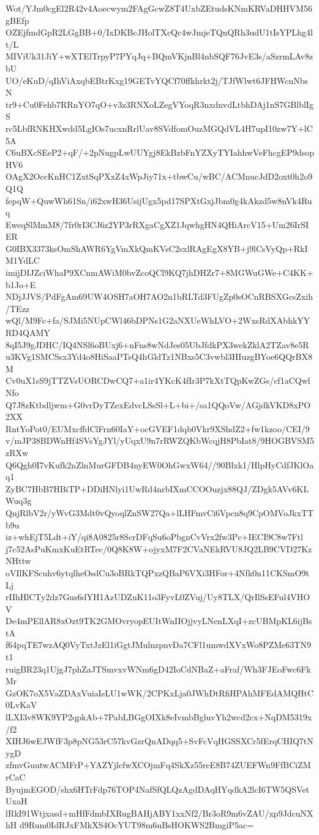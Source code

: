 Wot/YJm0cgEl2R42v4Aoecwym2FAgGcwZ8T4UxbZEtudsKNmKRVaDHHVM56gBEfp
OZEjfmdGpR2LGgBB+0/IxDKBcJHolTXcQc4wJmjeTQnQRh3udU1tIsYPLhg4lt/L
MIViUk31JiY+wXTElTrpyP7PYqJq+BQmVKjnBl4nbSQF76JvE3s/aSzrmLAv8zbU
UO/eKuD/qIhViAxqbEBtrKxg19GETvYQCf70ffkhrkt2j/TJfWlwt6JFHWcnNbsN
tr9+Cu0Fehb7RRnYO7qO+v3z3RNXoLZegVYoqR3nxdnvdLtbhDAj1nS7GBlblIgS
rc5LbfRNKHXwdd5LgIOs7ucxnRrlUav8SVdfomOuzMGQdVL4H7upI10zw7Y+lC5A
C6uBXcSEeP2+qF/+2pNugpLwUUYgj8EkBzbFnYZXyTYIahhwVeFhcgEP9dsopHV6
OAgX2OccKnHC1ZxtSqPXxZ4xWpJiy71x+tbwCu/wBC/ACMnucJdD2oxt0h2o9Q1Q
fepqW+QuwWh61Sn/i62xwH36UsijUgx5pd17SPXtGxjJbm0g4kAkzd5w8nVk4Ruq
EweqSlMmM8/7fr0rI3CJ6z2YP3rRXgaCgXZ1JqwhgHN4QHiArcV15+Um26IrSIER
G0IBX3373ksOmShAWR6YgVmXkQmKVsC2sxlRAgEgX8YB+j9lCsVyQp+RkIM1YdLC
imijDIJZciWhaP9XCnmAWiM0bvZcoQCl9KQ7jhDHZr7+8MGWuGWe+C4KK+b1Jo+E
NDjJJVS/PdFgAm69UW4OSH7aOH7AO2n1bRLTd3FUgZp0sOCnRBSXGcsZxih/TEzz
wQl/M9Fc+fa/SJMi5NUpCWl46bDPNs1G2aNXUeWhLVO+2WxsRdXAbhkYYRD4QAMY
8qI5J9gJDHC/IQ4NSl6oBUxj6+nFns8wNdJes05UbJfdkPX3wekZklA2TZav8e5R
u3KVg1SMCSsx3Yd4o8HiSaaPTsQ4hGldTz1NBxs5C3vwbl3HIuzgBYoe6QQrBX8M
Cv0uX1sS9jTTZVsUORCDwCQ7+a1ir4YKcK4fIr3P7kXtTQpKwZGs/cf1aCQwlNfo
Q7J8zKtbdljwm+G0vrDyTZexEdvcLSsSl+L+bi+/sa1QQoVw/AGjdkVKD8xPO2XX
RntYoPot0/EUMxcffdClFrn60IaY+ocGVEF1dqb0Vkr9XShdZ2+fw1kzoo/CEI/9
v/mJP38BDWnHf4SVsYgJYl/yUqxU9n7rRWZQKbWcqjH8PbIat8/9HOGBVSM5zRXw
Q6Qgh0I7vKufk2nZlnMurGFDB4nyEW0OhGwxW64//90Blxk1/HlpHyCdfJKlOaq1
ZyBC7HbB7HBiTP+DDiHNlyi1UwRd4nrbIXmCCOOuzjx88QJ/ZDgk5AVv6KLWuq3g
QnjRlbV2r/yWvG3Mdt0vQyoqlZnSW27Qa+lLHFmvCi6Vpcn8q9CpOMVoJkxTTb9u
iz+whEjT5Ldt+iY/qi8A0825r8ScrDFqSu6oPbgnCvVrx2fw3Pc+IECI9C8w7Ftl
j7c52AsPuKmxKuEtRTec/0Q8K8W+ojyxM7F2CVaNEkRVU8JQ2LB9CVD27KzNHttw
oVIlKFScuhv6ytqlheOsdCu3oBRkTQPxzQBaP6VXi3HFor+4Nfk0n11CKSmO9tLj
rIIhHlCTy2dz7Gus6dYH1AzUDZuK11o3FyvL0ZVuj/Uy8TLX/QrIlSsEFul4VHOV
De4mPEllAR8xOzt9TK2GMOvryopEUItWnIIOjjvyLNenLXqI+zcUBMpKL6ijBstA
f64pqTE7wzAQ0VyTxtJzEl1iGgtJMulnzpnvDa7CFl1umwdXVxWo8PZMe63TN9t1
ruigBR23q1UjgJ7phZaJTSmvxvWNm6gD42IoCdNBaZ+aFraf/Wh3FJEoFwc6FkMr
GzOK7oX5VaZDAxVuiaIsLU1wWK/2CPKxLja0JWhDtRfiHPAhMFEdAMQHtC0LvKaV
lLXI3v8WK9YP2qpkAb+7PabLBGgOIXk8eIvmbBgluvYh2wcd2cx+NqDM5319x/f2
XIHJ6wEJWfF3p8pNG53rC57kvGzrQnADqq5+SvFcVqHGSSXCr5fErqCHIQ7tNygD
zfmvGuutwACMFrP+YAZYjlcfwXCOjmFq4SkXz55reE8B74ZUEFWn9FfBCiZMrCaC
ByujmEGOD/shx6HTrFdp76TOP4NafSfQLQzAgdDAqHYqdkA2lcI6TW5QSVetUxaH
lRkI91Wtjxasd+mHfFdmbIXRugBAHjABY1xxNf2/Br3oR9m6vZAU/xp9JdcuNXhH
d9Rum0IdRJxFMkXS4OcYUT98m6uBsHOKWS2BmgiP5ac=
